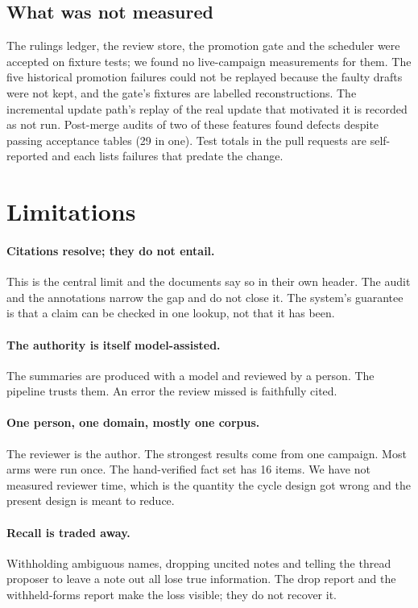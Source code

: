 \documentclass[11pt]{article}
\begin{document}
\subsection{What was not measured}

The rulings ledger, the review store, the promotion gate and the scheduler were accepted
on fixture tests; we found no live-campaign measurements for them. The five historical
promotion failures could not be replayed because the faulty drafts were not kept, and
the gate's fixtures are labelled reconstructions. The incremental update path's replay
of the real update that motivated it is recorded as not run. Post-merge audits of two of
these features found defects despite passing acceptance tables (29 in one). Test totals
in the pull requests are self-reported and each lists failures that predate the change.

\section{Limitations}

\paragraph{Citations resolve; they do not entail.} This is the central limit and the
documents say so in their own header. The audit and the annotations narrow the gap and
do not close it. The system's guarantee is that a claim can be checked in one lookup,
not that it has been.

\paragraph{The authority is itself model-assisted.} The summaries are produced with a
model and reviewed by a person. The pipeline trusts them. An error the review missed is
faithfully cited.

\paragraph{One person, one domain, mostly one corpus.} The reviewer is the author. The
strongest results come from one campaign. Most arms were run once. The hand-verified
fact set has 16 items. We have not measured reviewer time, which is the quantity the
cycle design got wrong and the present design is meant to reduce.

\paragraph{Recall is traded away.} Withholding ambiguous names, dropping uncited notes
and telling the thread proposer to leave a note out all lose true information. The
drop report and the withheld-forms report make the loss visible; they do not recover it.
\end{document}
